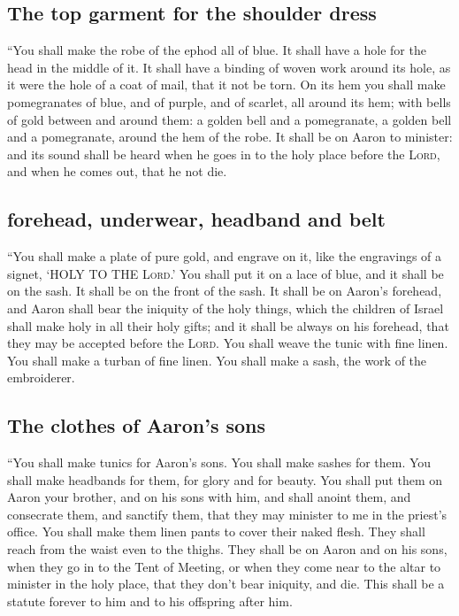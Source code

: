 \hypertarget{the-top-garment-for-the-shoulder-dress}{%
\subsection{The top garment for the shoulder
dress}\label{the-top-garment-for-the-shoulder-dress}}

 ``You shall make the robe of the ephod all of blue.
 It shall have a hole for the head in the middle of it.
It shall have a binding of woven work around its hole, as it were the
hole of a coat of mail, that it not be torn.  On its hem
you shall make pomegranates of blue, and of purple, and of scarlet, all
around its hem; with bells of gold between and around them:
 a golden bell and a pomegranate, a golden bell and a
pomegranate, around the hem of the robe.  It shall be on
Aaron to minister: and its sound shall be heard when he goes in to the
holy place before the \textsc{Lord}, and when he comes out, that he not
die.

\hypertarget{forehead-underwear-headband-and-belt}{%
\subsection{forehead, underwear, headband and
belt}\label{forehead-underwear-headband-and-belt}}

 ``You shall make a plate of pure gold, and engrave on
it, like the engravings of a signet, `HOLY TO THE \textsc{Lord}.'
 You shall put it on a lace of blue, and it shall be on
the sash. It shall be on the front of the sash.  It shall
be on Aaron's forehead, and Aaron shall bear the iniquity of the holy
things, which the children of Israel shall make holy in all their holy
gifts; and it shall be always on his forehead, that they may be accepted
before the \textsc{Lord}.  You shall weave the tunic with
fine linen. You shall make a turban of fine linen. You shall make a
sash, the work of the embroiderer.

\hypertarget{the-clothes-of-aarons-sons}{%
\subsection{The clothes of Aaron's
sons}\label{the-clothes-of-aarons-sons}}

 ``You shall make tunics for Aaron's sons. You shall make
sashes for them. You shall make headbands for them, for glory and for
beauty.  You shall put them on Aaron your brother, and on
his sons with him, and shall anoint them, and consecrate them, and
sanctify them, that they may minister to me in the priest's office.
 You shall make them linen pants to cover their naked
flesh. They shall reach from the waist even to the thighs.
 They shall be on Aaron and on his sons, when they go in
to the Tent of Meeting, or when they come near to the altar to minister
in the holy place, that they don't bear iniquity, and die. This shall be
a statute forever to him and to his offspring after him.

